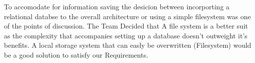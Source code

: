 \documentclass[12pt, titlepage]{article}
\begin{document}
To accomodate for information saving the desicion between incorporting a relational databse to the overall architecture or using a simple filesystem was one of the points of discussion. The Team Decided that A file system is a better suit as the complexity that accompanies setting up a database doesn't outweight it's benefits. A local storage system that can easly be overwritten (Filesystem) would be a good solution to satisfy our Requirements.\\\\
\end{document}
